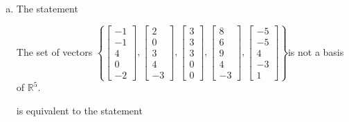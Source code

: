 \begin{exerciseAnswer}
\begin{enumerate}[(a)]
\item The statement 
\begin{center}\begin{minipage}{0.8\textwidth}
 The set of vectors \( \left\{ \left[\begin{array}{c}
-1 \\
-1 \\
4 \\
0 \\
-2
\end{array}\right] , \left[\begin{array}{c}
2 \\
0 \\
3 \\
4 \\
-3
\end{array}\right] , \left[\begin{array}{c}
3 \\
3 \\
3 \\
0 \\
0
\end{array}\right] , \left[\begin{array}{c}
8 \\
6 \\
9 \\
4 \\
-3
\end{array}\right] , \left[\begin{array}{c}
-5 \\
-5 \\
4 \\
-3 \\
1
\end{array}\right] \right\} \)is not a basis of \(\mathbb{R}^5\). 
\end{minipage}\end{center}
     is equivalent to the statement 
\begin{center}\begin{minipage}{0.8\textwidth}
 The set of vectors \( \left\{ \left[\begin{array}{c}
-1 \\
-1 \\
4 \\
0 \\
-2
\end{array}\right] , \left[\begin{array}{c}
2 \\
0 \\

\end{array}
\end{minipage}
\end{center}
\end{enumerate}
\end{exerciseAnswer}
